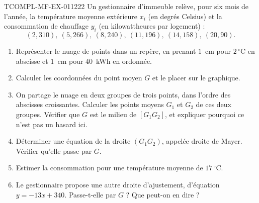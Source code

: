 \begin{exercice}{TCOMPL-MF-EX-011}{2}{22}
Un gestionnaire d'immeuble relève, pour six mois de l'année, la température
moyenne extérieure $x_i$ (en degrés Celsius) et la consommation de chauffage
$y_i$ (en kilowattheures par logement) :
\[
  (2,310),\ (5,266),\ (8,240),\ (11,196),\ (14,158),\ (20,90).
\]
\begin{enumerate}
  \item Représenter le nuage de points dans un repère, en prenant $1$~cm pour
    $2\,^\circ$C en abscisse et $1$~cm pour $40$~kWh en ordonnée.
  \item Calculer les coordonnées du point moyen $G$ et le placer sur le graphique.
  \item On partage le nuage en deux groupes de trois points, dans l'ordre des
    abscisses croissantes. Calculer les points moyens $G_1$ et $G_2$ de ces deux
    groupes. Vérifier que $G$ est le milieu de $[G_1G_2]$, et expliquer pourquoi
    ce n'est pas un hasard ici.
  \item Déterminer une équation de la droite $(G_1G_2)$, appelée droite de Mayer.
    Vérifier qu'elle passe par $G$.
  \item Estimer la consommation pour une température moyenne de $17\,^\circ$C.
  \item Le gestionnaire propose une autre droite d'ajustement, d'équation
    $y=-13x+340$. Passe-t-elle par $G$ ? Que peut-on en dire ?
\end{enumerate}
\end{exercice}
